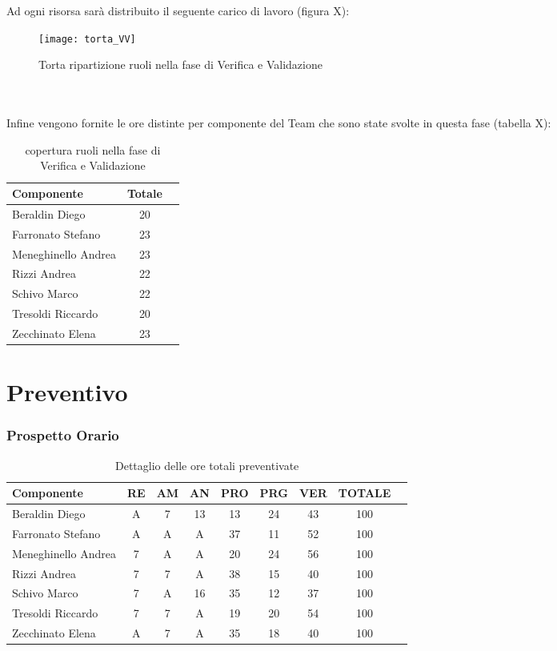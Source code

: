 \\\\
Ad ogni risorsa sarà distribuito il seguente carico di lavoro (figura X):\\
\begin{figure}[h]
  \texttt{[image: torta\_VV]}
\caption{Torta ripartizione ruoli nella fase di Verifica e Validazione}
\end{figure}
\\\\
Infine vengono fornite le ore distinte per componente del Team che sono state svolte in questa fase (tabella X):\\
\begin{table}[h]
\centering
\begin{tabular}{|l|cl|}
\hline
Componente& Totale& \\
\hline
Beraldin Diego & 20&\\
Farronato Stefano & 23&\\
Meneghinello Andrea & 23&\\
Rizzi Andrea & 22&\\
Schivo Marco & 22&\\
Tresoldi Riccardo & 20&\\
Zecchinato Elena & 23&\\
\hline
\end{tabular}
\caption{copertura ruoli nella fase di Verifica e Validazione}
\end{table}

\section{Preventivo}
\subsubsection{Prospetto Orario}

\begin{table}[h]
\centering
\begin{tabular}{|l|c|c|c|c|c|c|cl|}
\hline
Componente& RE& AM& AN& PRO& PRG& VER& TOTALE&\\
\hline
Beraldin Diego & A& 7& 13& 13& 24& 43& 100&\\
Farronato Stefano & A& A& A& 37& 11& 52&  100&\\
Meneghinello Andrea & 7& A& A& 20& 24& 56& 100&\\
Rizzi Andrea & 7& 7& A& 38& 15& 40& 100&\\
Schivo Marco & 7& A& 16& 35& 12& 37& 100&\\
Tresoldi Riccardo & 7& 7& A& 19& 20& 54& 100&\\
Zecchinato Elena & A& 7& A& 35& 18& 40& 100&\\
\hline
\end{tabular}
\caption{Dettaglio delle ore totali preventivate}
\end{table}

